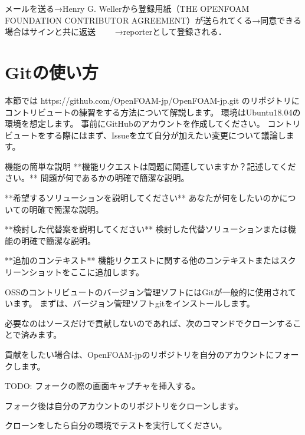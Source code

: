 \documentclass{ltjoc}
\begin{document}
メールを送る→Henry G. Wellerから登録用紙（THE OPENFOAM FOUNDATION CONTRIBUTOR AGREEMENT）が送られてくる→同意できる場合はサインと共に返送　
　→reporterとして登録される．

\section{Gitの使い方}
本節では https://github.com/OpenFOAM-jp/OpenFOAM-jp.git 
のリポジトリにコントリビュートの練習をする方法について解説します。
環境はUbuntu18.04の環境を想定します。
事前に{GitHub}のアカウントを作成してください。
コントリビュートをする際にはまず、Issueを立て自分が加えたい変更について議論します。

機能の簡単な説明
**機能リクエストは問題に関連していますか？記述してください。**
問題が何であるかの明確で簡潔な説明。

**希望するソリューションを説明してください**
あなたが何をしたいのかについての明確で簡潔な説明。

**検討した代替案を説明してください**
検討した代替ソリューションまたは機能の明確で簡潔な説明。

**追加のコンテキスト**
機能リクエストに関する他のコンテキストまたはスクリーンショットをここに追加します。

OSSのコントリビュートのバージョン管理ソフトにはGitが一般的に使用されています。
まずは、バージョン管理ソフトgitをインストールします。

\begin{shbox}
\end{shbox}

必要なのはソースだけで貢献しないのであれば、次のコマンドでクローンすることで済みます。

\begin{shbox}
\end{shbox}

貢献をしたい場合は、OpenFOAM-jpのリポジトリを自分のアカウントにフォークします。

TODO: フォークの際の画面キャプチャを挿入する。

フォーク後は自分のアカウントのリポジトリをクローンします。

\begin{shbox}
\end{shbox}

クローンをしたら自分の環境でテストを実行してください。
\end{document}

